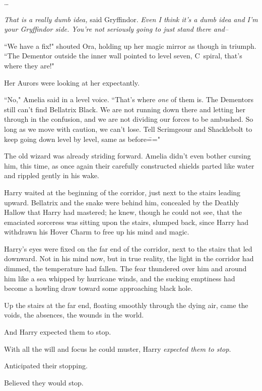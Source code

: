 {\ldots}

\emph{That is a really dumb idea,} said Gryffindor. \emph{Even I think it's a dumb idea and I'm your Gryffindor side. You're not seriously going to just stand there and\---}

\later

``We have a fix!" shouted Ora, holding up her magic mirror as though in triumph. ``The Dementor outside the inner wall pointed to level seven, C~spiral, that's where they are!"

Her Aurors were looking at her expectantly.

``No," Amelia said in a level voice. ``That's where \emph{one} of them is. The Dementors still can't find Bellatrix Black. We are not running down there and letting her through in the confusion, and we are not dividing our forces to be ambushed. So long as we move with caution, we can't lose. Tell Scrimgeour and Shacklebolt to keep going down level by level, same as before\==="

The old wizard was already striding forward. Amelia didn't even bother cursing him, this time, as once again their carefully constructed shields parted like water and rippled gently in his wake.

\later

Harry waited at the beginning of the corridor, just next to the stairs leading upward. Bellatrix and the snake were behind him, concealed by the Deathly Hallow that Harry had mastered; he knew, though he could not see, that the emaciated sorceress was sitting upon the stairs, slumped back, since Harry had withdrawn his Hover Charm to free up his mind and magic.

Harry's eyes were fixed on the far end of the corridor, next to the stairs that led downward. Not in his mind now, but in true reality, the light in the corridor had dimmed, the temperature had fallen. The fear thundered over him and around him like a sea whipped by hurricane winds, and the sucking emptiness had become a howling draw toward some approaching black hole.

Up the stairs at the far end, floating smoothly through the dying air, came the voids, the absences, the wounds in the world.

And Harry expected them to stop.

With all the will and focus he could muster, Harry \emph{expected them to stop}.

Anticipated their stopping.

Believed they would stop.

